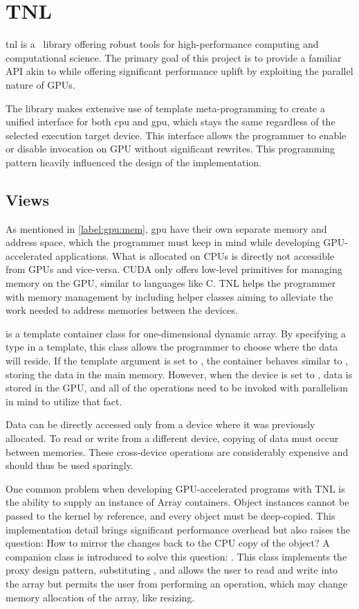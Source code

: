 \section{TNL}

\acrfull{tnl} \cite{tnl} is a \CC\ library offering robust tools for high-performance computing and computational science. The primary goal of this project is to provide a familiar API akin to  while offering significant performance uplift by exploiting the parallel nature of GPUs.

The library makes extensive use of template meta-programming to create a unified interface for both \acrshort{cpu} and \acrshort{gpu}, which stays the same regardless of the selected execution target device. This interface allows the programmer to enable or disable invocation on GPU without significant rewrites. This programming pattern heavily influenced the design of the implementation.

\subsection{Views}

As mentioned in \cref{label:gpu:mem}, \acrshort{gpu} have their own separate memory and address space, which the programmer must keep in mind while developing GPU-accelerated applications. What is allocated on CPUs is directly not accessible from GPUs and vice-versa. CUDA only offers low-level primitives for managing memory on the GPU, similar to languages like C. TNL helps the programmer with memory management by including helper classes aiming to alleviate the work needed to address memories between the devices.

 is a template container class for one-dimensional dynamic array. By specifying a type in a template, this class allows the programmer to choose where the data will reside. If the template argument is set to , the container behaves similar to , storing the data in the main memory. However, when the device is set to , data is stored in the GPU, and all of the operations need to be invoked with parallelism in mind to utilize that fact.

Data can be directly accessed only from a device where it was previously allocated. To read or write from a different device, copying of data must occur between memories. These cross-device operations are considerably expensive and should thus be used sparingly.

One common problem when developing GPU-accelerated programs with TNL is the ability to supply an instance of Array containers. Object instances cannot be passed to the kernel by reference, and every object must be deep-copied. This implementation detail brings significant performance overhead but also raises the question: How to mirror the changes back to the CPU copy of the object? A companion class is introduced to solve this question: . This class implements the proxy design pattern, substituting , and allows the user to read and write into the array but permits the user from performing an operation, which may change memory allocation of the array, like resizing.
